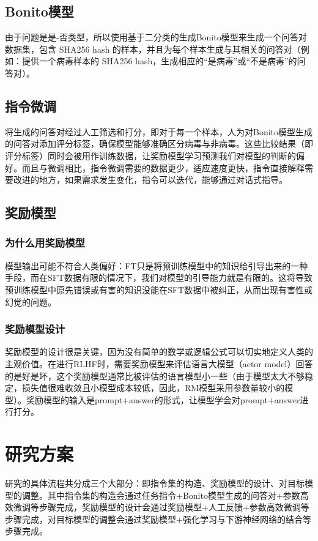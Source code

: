 \subsection{Bonito模型}
由于问题是是-否类型，所以使用基于二分类的生成Bonito模型来生成一个问答对数据集，包含 SHA256 hash 的样本，并且为每个样本生成与其相关的问答对（例如：提供一个病毒样本的 SHA256 hash，生成相应的“是病毒”或“不是病毒”的问答对）。

\subsection{指令微调}
将生成的问答对经过人工筛选和打分，即对于每一个样本，人为对Bonito模型生成的问答对添加评分标签，确保模型能够准确区分病毒与非病毒。这些比较结果（即评分标签）同时会被用作训练数据，让奖励模型学习预测我们对模型的判断的偏好。而且与微调相比，指令微调需要的数据更少，适应速度更快\cite{pmlr-v202-longpre23a}，指令直接解释需要改进的地方，如果需求发生变化，指令可以迭代，能够通过对话式指导。


\subsection{奖励模型}
\subsubsection{为什么用奖励模型}
模型输出可能不符合人类偏好：FT只是将预训练模型中的知识给引导出来的一种手段，而在SFT数据有限的情况下，我们对模型的引导能力就是有限的。这将导致预训练模型中原先错误或有害的知识没能在SFT数据中被纠正，从而出现有害性或幻觉\cite{Ye2023CognitiveMA}的问题。
\subsubsection{奖励模型设计}
奖励模型的设计很是关键，因为没有简单的数学或逻辑公式可以切实地定义人类的主观价值。在进行RLHF时，需要奖励模型来评估语言大模型（actor model）回答的是好是坏，这个奖励模型通常比被评估的语言模型小一些（由于模型太大不够稳定，损失值很难收敛且小模型成本较低，因此，RM模型采用参数量较小的模型）。奖励模型的输入是prompt+answer的形式，让模型学会对prompt+answer进行打分。

\section{研究方案}
研究的具体流程共分成三个大部分：即指令集的构造、奖励模型的设计、对目标模型的调整。其中指令集的构造会通过任务指令+Bonito模型生成的问答对+参数高效微调等步骤完成，奖励模型的设计会通过奖励模型+人工反馈+参数高效微调等步骤完成，对目标模型的调整会通过奖励模型+强化学习与下游神经网络的结合等步骤完成。

